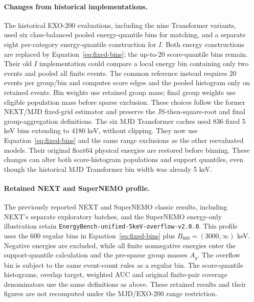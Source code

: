 



\paragraph{Changes from historical implementations.}
The historical EXO-200 evaluations, including the nine Transformer variants,
used six class-balanced
pooled energy-quantile bins for matching, and a separate eight per-category
energy-quantile construction for $I$. Both energy constructions are replaced
by Equation~\ref{eq:fixed-bins}; the up-to-20 score-quantile bins remain.
Their old $I$ implementation could compare a local energy bin containing
only two events and pooled all finite events. The common reference instead
requires 20 events per group/bin and computes score edges and the pooled
histogram only on retained events. Bin weights use retained group mass;
final group weights use eligible population mass before sparse exclusion.
These choices follow the former NEXT/MJD fixed-grid estimator and preserve
the JS-then-square-root and final group-aggregation definitions.
The six MJD Transformer caches used 836 fixed 5 keV bins extending to
4180 keV, without clipping. They now use Equation~\ref{eq:fixed-bins} and
the same range exclusions as the other reevaluated models. Their original
float64 physical energies are restored before binning. These changes can
alter both score-histogram populations and support quantiles, even though
the historical MJD Transformer bin width was already 5 keV.

\paragraph{Retained NEXT and SuperNEMO profile.}
The previously reported NEXT and SuperNEMO classic results, including NEXT's
separate exploratory batches, and the SuperNEMO energy-only illustration
retain \texttt{EnergyBench-unified-}\allowbreak\texttt{5keV-overflow-v2.0.0}.
This profile uses the 600 regular bins in Equation~\ref{eq:fixed-bins} plus
$B_{600}=(3000,\infty)$ keV. Negative energies are excluded, while all
finite nonnegative energies enter the support-quantile calculation and the
pre-sparse group masses $A_g$. The overflow bin is subject to the same
event-count rules as a regular bin. The score-quantile histograms, overlap
target, weighted AUC and original finite-pair coverage denominators use
the same definitions as above. These retained results and their figures
are not recomputed under the MJD/EXO-200 range restriction.

